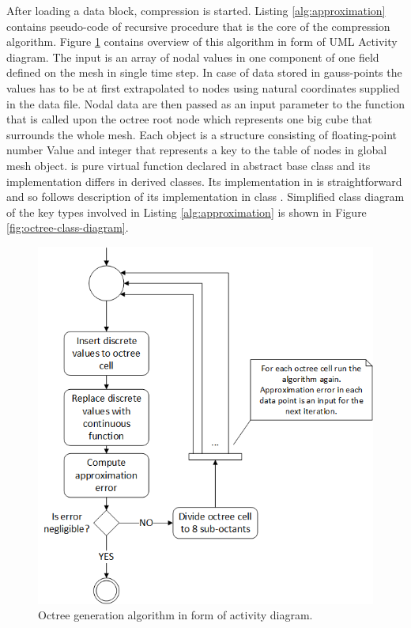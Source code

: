 After loading a data block, compression is started. Listing \ref{alg:approximation} contains pseudo-code of recursive procedure that is the core of the compression algorithm. Figure \ref{fig:octree-generation} contains overview of this algorithm in form of UML Activity diagram. The input is an array of nodal values in one component of one field defined on the mesh in single time step. In case of data stored in gauss-points the values has to be at first extrapolated to nodes using natural coordinates supplied in the data file. Nodal data are then passed as an input parameter  to the function  that is called upon the octree root node which represents one big cube that surrounds the whole mesh. Each  object is a structure consisting of floating-point number Value and integer  that represents a key to the table of nodes in global mesh object.  is pure virtual function declared in abstract base class  and its implementation differs in derived classes. Its implementation in  is straightforward and so follows description of its implementation in class . Simplified class diagram of the key types involved in Listing \ref{alg:approximation} is shown in Figure \ref{fig:octree-class-diagram}.

\begin{figure}[H]
\centering
\includegraphics[width=\textwidth]{figures/appendix-approximation/figure2}
\decoRule
\caption[Octree generation]{Octree generation algorithm in form of activity diagram.}
\label{fig:octree-generation}
\end{figure}


